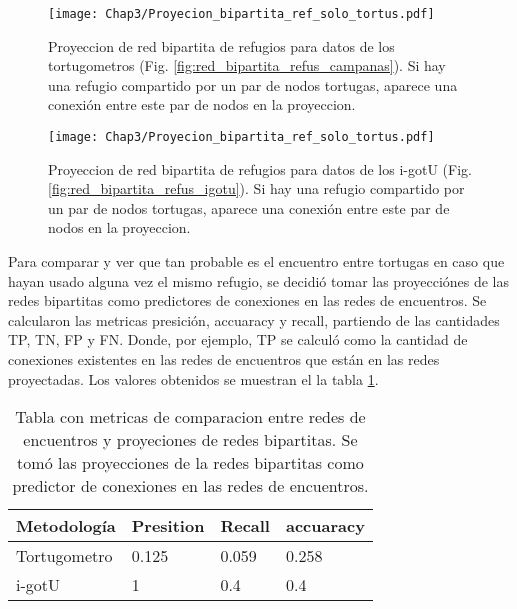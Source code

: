 \begin{figure}[ht]
    \begin{center}
        \texttt{[image: Chap3/Proyecion\_bipartita\_ref\_solo\_tortus.pdf]}
        \caption[Proyeccion  de red bipartita de refugios para datos de los tortugometros.]{Proyeccion  de red bipartita de refugios para datos de los tortugometros (Fig. \ref{fig:red_bipartita_refus_campanas}). Si hay una refugio compartido por un par de nodos tortugas, aparece una conexión entre este par de nodos en la proyeccion. } 
        \label{fig:proyeccion_red_campanas}
        
        \end{center}
\end{figure} 

\begin{figure}[ht]
    \begin{center}
        \texttt{[image: Chap3/Proyecion\_bipartita\_ref\_solo\_tortus.pdf]}
        \caption[Proyeccion  de red bipartita de refugios para datos de los tortugometros.]{Proyeccion  de red bipartita de refugios para datos de los i-gotU (Fig. \ref{fig:red_bipartita_refus_igotu}). Si hay una refugio compartido por un par de nodos tortugas, aparece una conexión entre este par de nodos en la proyeccion. } 
        \label{fig:proyeccion_red_igotu}
        
        \end{center}
\end{figure} 
Para comparar y ver que tan probable es el encuentro entre tortugas en caso que hayan usado alguna vez el mismo refugio, se decidió tomar las proyecciónes de las redes bipartitas como predictores de conexiones en las redes de encuentros. Se calcularon las metricas presición, accuaracy y recall, partiendo de las cantidades TP, TN, FP y FN. Donde, por ejemplo, TP se calculó como la cantidad de conexiones existentes en las redes de encuentros que están en las redes proyectadas. Los valores obtenidos se muestran el la tabla \ref{tab:metricas_comparacion_redes}.
\begin{table}[ht]
    \centering
    \begin{tabular}{|l|l|l|l|}
        
   \hline
    Metodología  & Presition & Recall & accuaracy \\ \hline
    Tortugometro & 0.125     & 0.059  & 0.258    \\ \hline
    i-gotU       & 1         & 0.4    & 0.4       \\ \hline
    
    \end{tabular}
    \caption[Tabla con metricas de comparacion entre redes de encuentros y proyeciones de redes bipartitas.]{Tabla con metricas de comparacion entre redes de encuentros y proyeciones de redes bipartitas. Se tomó las proyecciones de la redes bipartitas como predictor de conexiones en las redes de encuentros.}
    \label{tab:metricas_comparacion_redes}
\end{table}


